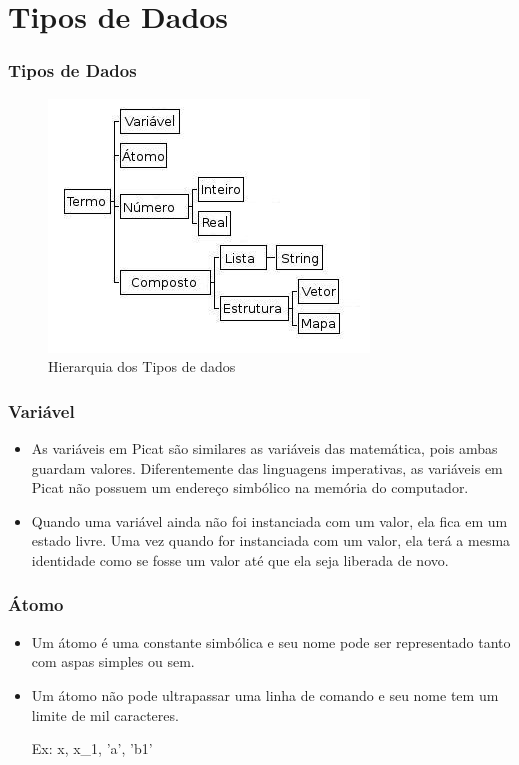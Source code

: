 \documentclass{beamer}
\begin{document}

\section{Tipos de Dados}
\begin{frame}
\frametitle{Tipos de Dados}
\begin{figure}[!ht]
\centering
\includegraphics[width=.6\textwidth]{tipos_dados_picat_traduzido.jpg}
\caption{Hierarquia dos Tipos de dados}
\label{Hiera}
\end{figure}
\end{frame}


\begin{frame}
    \frametitle{Variável}
    \begin{itemize}
     \item As variáveis em Picat são similares as variáveis das matemática, pois ambas guardam valores. 
	   Diferentemente das linguagens imperativas, as variáveis em Picat não possuem um endereço simbólico na memória do computador.
     \item Quando uma variável ainda não foi instanciada com um valor, ela fica em um estado livre. 
	   Uma vez quando for instanciada com um valor, ela terá a mesma identidade como se fosse um valor até que ela seja liberada de novo.
    \end{itemize}
\end{frame}


\begin{frame}
    \frametitle{Átomo}
    \begin{itemize}
     \item Um átomo é uma constante simbólica e seu nome pode ser representado tanto com aspas simples ou sem. 
     \item Um átomo não pode ultrapassar uma linha de comando e seu nome tem um limite de mil caracteres. 
    
    Ex: x, x\_1, ’a’, ’b1’
    \end{itemize}
\end{frame}
\end{document}

